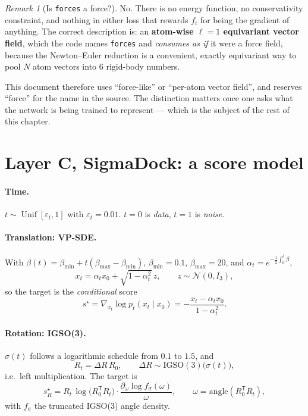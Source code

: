 \documentclass[11pt,a4paper]{report}
\theoremstyle{definition}
\theoremstyle{remark}
\newtheorem{remark}[remark]{Remark}
\DeclareMathOperator{\Unif}{Unif}
\begin{document}
\begin{remark}[Is \texttt{forces} a force?]
\label{rem:forces-is-a-name}
No. There is no energy function, no conservativity constraint, and nothing in
either loss that rewards $f_i$ for being the gradient of anything. The
correct description is: an \textbf{atom-wise $\ell=1$ equivariant vector
field}, which the code names \texttt{forces} and \emph{consumes as if} it
were a force field, because the Newton--Euler reduction is a convenient,
exactly equivariant way to pool $N$ atom vectors into $6$ rigid-body numbers.

This document therefore uses ``force-like'' or ``per-atom vector field'',
and reserves ``force'' for the name in the source. The distinction matters
once one asks what the network is being trained to represent --- which is the
subject of the rest of this chapter.
\end{remark}

\section{Layer C, SigmaDock: a score model}
\label{sec:engine-sigmadock}

\paragraph{Time.} $t\sim\Unif[\varepsilon_t,1]$ with $\varepsilon_t=0.01$.
$t=0$ is \emph{data}, $t=1$ is \emph{noise}.

\paragraph{Translation: VP-SDE.} With $\beta(t)=\beta_{\min}+t(\beta_{\max}-\beta_{\min})$,
$\beta_{\min}=0.1$, $\beta_{\max}=20$, and $\alpha_t=e^{-\frac12\int_0^t\beta}$,
\begin{equation}
x_t = \alpha_t x_0 + \sqrt{1-\alpha_t^2}\,z,\qquad z\sim\mathcal N(0,I_3),
\end{equation}
so the target is the \emph{conditional} score
\begin{equation}
\label{eq:engine-dock-trans-target}
s^\star = \nabla_{x_t}\log p_t(x_t\mid x_0) = -\frac{x_t-\alpha_tx_0}{1-\alpha_t^2}.
\end{equation}

\paragraph{Rotation: IGSO(3).} $\sigma(t)$ follows a logarithmic schedule from
$0.1$ to $1.5$, and
\begin{equation}
R_t = \Delta R\,R_0,\qquad \Delta R\sim\mathrm{IGSO}(3)\bigl(\sigma(t)\bigr),
\end{equation}
i.e.\ left multiplication. The target is
\begin{equation}
\label{eq:engine-dock-rot-target}
s^\star_R = R_t\,\log\!\bigl(R_0^{\mathsf T}R_t\bigr)\cdot
\frac{\partial_\omega\log f_{\sigma}(\omega)}{\omega},
\qquad \omega = \text{angle}(R_0^{\mathsf T}R_t),
\end{equation}
with $f_\sigma$ the truncated IGSO(3) angle density.
\end{document}
